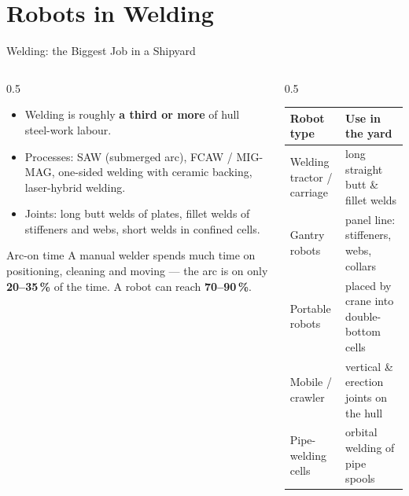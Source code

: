 \documentclass[aspectratio=169]{beamer}
\begin{document}
	\section{Robots in Welding}
	\begin{frame}{Welding: the Biggest Job in a Shipyard}
		\begin{columns}[T]
			\begin{column}{0.5\textwidth}
				\begin{itemize}\small
					\item Welding is roughly \textbf{a third or more} of hull steel-work labour.
					\item Processes: SAW (submerged arc), FCAW / MIG-MAG, one-sided welding with ceramic backing, laser-hybrid welding.
					\item Joints: long butt welds of plates, fillet welds of stiffeners and webs, short welds in confined cells.
				\end{itemize}
				\begin{block}{Arc-on time}
					\small A manual welder spends much time on positioning, cleaning and moving --- the arc is on only \textbf{20--35\,\%} of the time. A robot can reach \textbf{70--90\,\%}.
				\end{block}
			\end{column}
			\begin{column}{0.5\textwidth}
				\renewcommand{\arraystretch}{1.25}
				\centering
				\small
				\begin{tabular}{@{}>{\raggedright}p{2.2cm}>{\raggedright\arraybackslash}p{3.6cm}@{}}
					\toprule
					\textbf{Robot type} & \textbf{Use in the yard} \\
					\midrule
					Welding tractor / carriage & long straight butt \& fillet welds \\
					Gantry robots & panel line: stiffeners, webs, collars \\
					Portable robots & placed by crane into double-bottom cells \\
					Mobile / crawler & vertical \& erection joints on the hull \\
					Pipe-welding cells & orbital welding of pipe spools \\
					\bottomrule
				\end{tabular}
			\end{column}
		\end{columns}
	\end{frame}
\end{document}
